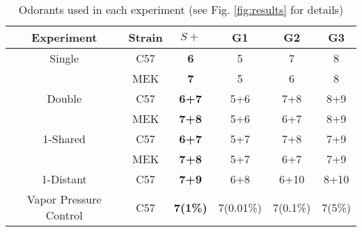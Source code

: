\begin{table}
\label{tab:design}
    \begin{tabular}{ c | c | c | c | c | c }
        Experiment & Strain & \textbf{$S+$} & G1 & G2 & G3 \\ 
        \hline
        Single & C57 & \textbf{6} & 5 & 7 & 8 \\ 
         & MEK & \textbf{7} & 5 & 6 & 8 \\ 
        \hline
        Double & C57 & \textbf{6+7} & 5+6 & 7+8 & 8+9 \\ 
         & MEK & \textbf{7+8} & 5+6 & 6+7 & 8+9 \\ 
        \hline
        1-Shared & C57 & \textbf{6+7} & 5+7 & 7+8 & 7+9 \\ 
         & MEK & \textbf{7+8} & 5+7 & 6+7 & 7+9 \\ 
        \hline
        1-Distant & C57 & \textbf{7+9} & 6+8 & 6+10 & 8+10 \\ 
        \hline
        Vapor Pressure Control & C57 & \textbf{7(1\%)} & 7(0.01\%) & 7(0.1\%) & 7(5\%) \\ 
    \end{tabular}
    \caption{Odorants used in each experiment (see Fig. \ref{fig:results} for details)}
\end{table}